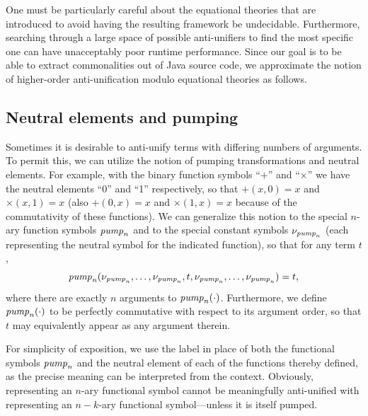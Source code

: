 One must be particularly careful about the equational theories that are introduced to avoid having the resulting framework be undecidable.  Furthermore, searching through a large space of possible anti-unifiers to find the most specific one can have unacceptably poor runtime performance.  Since our goal is to be able to extract commonalities out of Java source code, we approximate the notion of higher-order anti-unification modulo equational theories as follows.

\subsection{Neutral elements and pumping}

Sometimes it is desirable to anti-unify terms with differing numbers of arguments.  To permit this, we can utilize the notion of pumping transformations and neutral elements.  For example, with the binary function symbols ``$+$'' and ``$\times$'' we have the neutral elements ``0'' and ``1'' respectively, so that $+(x, 0)=x$ and $\times(x, 1)=x$ (also $+(0, x)=x$ and $\times(1, x)=x$ because of the commutativity of these functions).  We can generalize this notion to the special $n$-ary function symbols $\mathit{pump}_n$ and to the special constant symbols $\nu_{\mathit{pump}_n}$ (each representing the neutral symbol for the indicated function), so that for any term $t$,
\begin{equation*}
\mathit{pump}_n(\nu_{\mathit{pump}_n}, \ldots, \nu_{\mathit{pump}_n}, t, \nu_{\mathit{pump}_n}, \ldots, \nu_{\mathit{pump}_n}) = t,
\end{equation*}
where there are exactly $n$ arguments to $\mathit{pump}_n(\cdot)$.  Furthermore, we define $\mathit{pump}_n(\cdot)$ to be perfectly commutative with respect to its argument order, so that $t$ may equivalently appear as any argument therein.

For simplicity of exposition, we use the label \NIL{} in place of both the functional symbols $\mathit{pump}_n$ and the neutral element of each of the functions thereby defined, as the precise meaning can be interpreted from the context.  Obviously, \NIL{} representing an $n$-ary functional symbol cannot be meaningfully anti-unified with \NIL{} representing an $n-k$-ary functional symbol---unless it is itself pumped.

